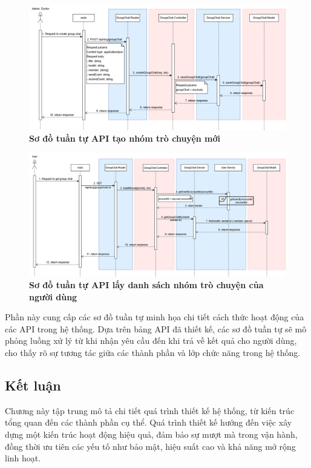 \begin{figure}[H]
	\centering
	\includegraphics[width=16cm]{Images/api_sequence/chat/createGroupChat.drawio.png}
	\caption[Sơ đồ tuần tự API tạo nhóm trò chuyện mới]{\bfseries \fontsize{12pt}{0pt}\selectfont Sơ đồ tuần tự API tạo nhóm trò chuyện mới}
	\label{sequence_diagram_create_group_chat}
\end{figure}

\begin{figure}[H]
	\centering
	\includegraphics[width=16cm]{Images/api_sequence/chat/getGroupChat.drawio.png}
	\caption[Sơ đồ tuần tự API lấy danh sách nhóm trò chuyện của người dùng]{\bfseries \fontsize{12pt}{0pt}\selectfont Sơ đồ tuần tự API lấy danh sách nhóm trò chuyện của người dùng}
	\label{sequence_diagram_get_group_chat}
\end{figure}
Phần này cung cấp các sơ đồ tuần tự minh họa chi tiết cách thức hoạt động của các API trong hệ thống.
Dựa trên bảng API đã thiết kế, các sơ đồ tuần tự sẽ mô phỏng luồng xử lý từ khi nhận yêu cầu đến khi trả về kết quả cho người dùng,
cho thấy rõ sự tương tác giữa các thành phần và lớp chức năng trong hệ thống.

\subsection{Kết luận}

Chương này tập trung mô tả chi tiết quá trình thiết kế hệ thống, từ kiến trúc tổng quan đến các thành phần cụ thể.
Quá trình thiết kế hướng đến việc xây dựng một kiến trúc hoạt động hiệu quả, đảm bảo sự mượt mà trong vận hành,
đồng thời ưu tiên các yếu tố như bảo mật, hiệu suất cao và khả năng mở rộng linh hoạt.
\newpage